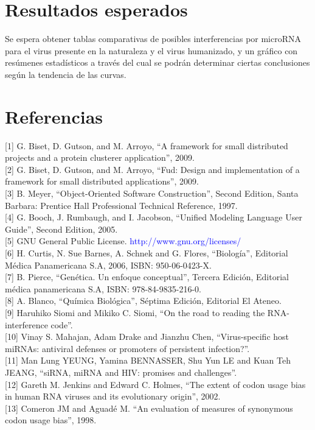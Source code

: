 \documentclass[12pt,a4paper]{article}
\begin{document}
\section{Resultados esperados}
Se espera obtener tablas comparativas de posibles interferencias por microRNA para el virus presente en la naturaleza y el virus humanizado, y un gráfico con resúmenes estadísticos a través del cual se podrán determinar ciertas conclusiones según la tendencia de las curvas. 


\section*{Referencias}
[1] G. Biset, D. Gutson, and M. Arroyo, “A framework for small distributed projects and a protein clusterer application”, 2009. \\

[2] G. Biset, D. Gutson, and M. Arroyo, “Fud: Design and implementation of a framework for small distributed applications”, 2009. \\

[3] B. Meyer, “Object-Oriented Software Construction”, Second Edition, Santa Barbara: Prentice Hall Professional Technical Reference, 1997. \\

[4] G. Booch, J. Rumbaugh, and I. Jacobson, “Unified Modeling Language User Guide”, Second Edition, 2005. \\

[5] GNU General Public License. \textcolor{blue}{http://www.gnu.org/licenses/} \\

[6] H. Curtis, N. Sue Barnes, A. Schnek and G. Flores, “Biología”, Editorial Médica Panamericana S.A, 2006, ISBN: 950-06-0423-X. \\

[7] B. Pierce, “Genética. Un enfoque conceptual”, Tercera Edición, Editorial médica panamericana S.A, ISBN: 978-84-9835-216-0. \\

[8] A. Blanco, “Química Biológica”, Séptima Edición, Editorial El Ateneo. \\

[9] Haruhiko Siomi and Mikiko C. Siomi, “On the road to reading the RNA-interference code”. \\

[10] Vinay S. Mahajan, Adam Drake and Jianzhu Chen, “Virus-specific host miRNAs: antiviral defenses or promoters of persistent infection?”. \\

[11] Man Lung YEUNG, Yamina BENNASSER, Shu Yun LE and Kuan Teh JEANG, “siRNA, miRNA and HIV: promises and challenges”. \\

[12] Gareth M. Jenkins and Edward C. Holmes, “The extent of codon usage bias in human RNA viruses and its evolutionary origin”, 2002. \\

[13] Comeron JM and Aguadé M. “An evaluation of measures of synonymous codon usage bias”, 1998. \\
\end{document}
